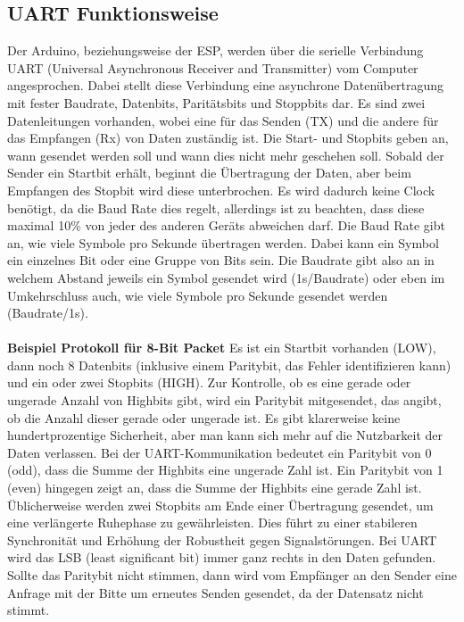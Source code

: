 \documentclass[titlepage,12pt,twoside]{article}
\begin{document}
\subsection{UART Funktionsweise}
\label{chap:UART Funktionsweise}
Der Arduino, beziehungsweise der ESP, werden über die serielle Verbindung UART 
(Universal Asynchronous Receiver and Transmitter) vom Computer angesprochen. 
Dabei stellt diese Verbindung eine asynchrone Datenübertragung mit fester Baudrate, 
Datenbits, Paritätsbits und Stoppbits dar. Es sind zwei Datenleitungen vorhanden, wobei 
eine für das Senden (TX) und die andere für das Empfangen (Rx) von Daten zuständig ist. 
Die Start- und Stopbits geben an, wann gesendet werden soll und wann dies nicht 
mehr geschehen soll. Sobald der Sender ein Startbit erhält, beginnt die Übertragung 
der Daten, aber beim Empfangen des Stopbit wird diese unterbrochen. Es wird 
dadurch keine Clock benötigt, da die Baud Rate dies regelt, allerdings ist zu 
beachten, dass diese maximal 10\% von jeder des anderen Geräts abweichen darf. 
Die Baud Rate gibt an, wie viele Symbole pro Sekunde übertragen werden. Dabei 
kann ein Symbol ein einzelnes Bit oder eine Gruppe von Bits sein. Die Baudrate 
gibt also an in welchem Abstand jeweils ein Symbol gesendet wird (1s/Baudrate) 
oder eben im Umkehrschluss auch, wie viele Symbole pro Sekunde gesendet werden 
(Baudrate/1s). \\
\\
\textbf{Beispiel Protokoll für 8-Bit Packet}
Es ist ein Startbit vorhanden (LOW), dann noch 8 Datenbits (inklusive einem 
Paritybit, das Fehler identifizieren kann) und ein oder zwei Stopbits (HIGH). 
Zur Kontrolle, ob es eine gerade oder ungerade Anzahl von Highbits gibt, wird 
ein Paritybit mitgesendet, das angibt, ob die Anzahl dieser gerade oder ungerade 
ist. Es gibt klarerweise keine hundertprozentige Sicherheit, aber man kann sich 
mehr auf die Nutzbarkeit der Daten verlassen. Bei der UART-Kommunikation bedeutet 
ein Paritybit von 0 (odd), dass die Summe der Highbits eine ungerade Zahl ist. Ein 
Paritybit von 1 (even) hingegen zeigt an, dass die Summe der Highbits eine gerade 
Zahl ist. Üblicherweise werden zwei Stopbits am Ende einer Übertragung gesendet, 
um eine verlängerte Ruhephase zu gewährleisten. 
Dies führt zu einer stabileren Synchronität und Erhöhung der Robustheit gegen 
Signalstörungen. Bei UART wird das LSB (least significant bit) immer ganz rechts 
in den Daten gefunden. Sollte das Paritybit nicht stimmen, dann wird vom 
Empfänger an den Sender eine Anfrage mit der Bitte um erneutes Senden gesendet, 
da der Datensatz nicht stimmt. \\
\end{document}
